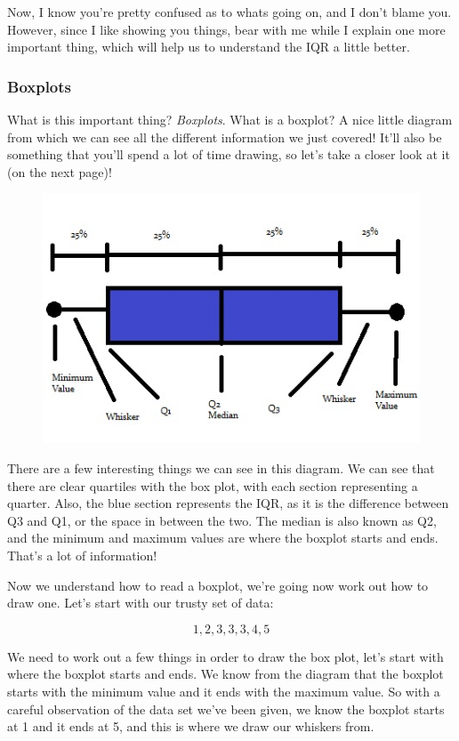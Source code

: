 \documentclass[11pt]{article}
\begin{document}
Now, I know you're pretty confused as to whats going on, and I don't blame you. However, since I like showing you things, bear with me while I explain one more important thing, which will help us to understand the IQR a little better.

\subsubsection*{Boxplots}

What is this important thing? \emph{Boxplots}. What is a boxplot? A nice little diagram from which we can see all the different information we just covered! It'll also be something that you'll spend a lot of time drawing, so let's take a closer look at it (on the next page)!

\clearpage{}
\begin{figure}[htp]
\centering
\includegraphics[scale=1.00]{IQRImage7.jpg}
\end{figure}

There are a few interesting things we can see in this diagram. We can see that there are clear quartiles with the box plot, with each section representing a quarter. Also, the blue section represents the IQR, as it is the difference between Q3 and Q1, or the space in between the two. The median is also known as Q2, and the minimum and maximum values are where the boxplot starts and ends. That's a lot of information!

Now we understand how to read a boxplot, we're going now work out how to draw one. Let's start with our trusty set of data:

\begin{displaymath}
1, 2, 3, 3, 3, 4, 5
\end{displaymath}

We need to work out a few things in order to draw the box plot, let's start with where the boxplot starts and ends. We know from the diagram that the boxplot starts with the minimum value and it ends with the maximum value. So with a careful observation of the data set we've been given, we know the boxplot starts at 1 and it ends at 5, and this is where we draw our whiskers from.
\end{document}
